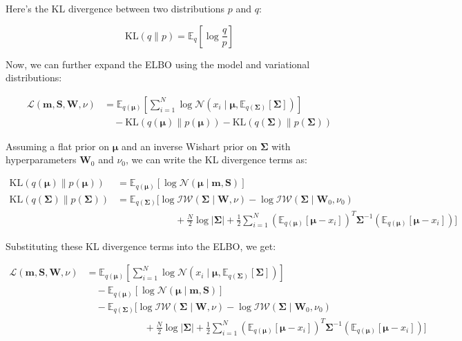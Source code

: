 \documentclass[11pt]{article}
\begin{document}
    Here's the KL divergence between two distributions \( p \) and \( q \):

    $$\text{KL}(q \| p) = \mathbb{E}_{q} \left[ \log \frac{q}{p} \right]$$

    Now, we can further expand the ELBO using the model and variational distributions:

    \begin{align*}
        \mathcal{L}(\boldsymbol{m}, \boldsymbol{S}, \boldsymbol{W}, \nu) &= \mathbb{E}_{q(\boldsymbol{\mu})} \left[ \sum_{i=1}^N \log \mathcal{N}(x_i \mid \boldsymbol{\mu}, \mathbb{E}_{q(\boldsymbol{\Sigma})}[\boldsymbol{\Sigma}]) \right] \\
        &\quad - \text{KL}(q(\boldsymbol{\mu}) \| p(\boldsymbol{\mu})) - \text{KL}(q(\boldsymbol{\Sigma}) \| p(\boldsymbol{\Sigma}))
    \end{align*}

    Assuming a flat prior on \( \boldsymbol{\mu} \) and an inverse Wishart prior on \( \boldsymbol{\Sigma} \) with hyperparameters \( \boldsymbol{W}_0 \) and \( \nu_0 \), we can write the KL divergence terms as:

    \begin{align*}
        \text{KL}(q(\boldsymbol{\mu}) \| p(\boldsymbol{\mu})) &= \mathbb{E}_{q(\boldsymbol{\mu})} \left[ \log \mathcal{N}(\boldsymbol{\mu} \mid \boldsymbol{m}, \boldsymbol{S}) \right] \\
        \text{KL}(q(\boldsymbol{\Sigma}) \| p(\boldsymbol{\Sigma})) &= \mathbb{E}_{q(\boldsymbol{\Sigma})} \bigg[ \log \mathcal{IW}(\boldsymbol{\Sigma} \mid \boldsymbol{W}, \nu) - \log \mathcal{IW}(\boldsymbol{\Sigma} \mid \boldsymbol{W}_0, \nu_0) \\
        &\qquad\qquad\qquad + \frac{N}{2} \log |\boldsymbol{\Sigma}| + \frac{1}{2} \sum_{i=1}^N (\mathbb{E}_{q(\boldsymbol{\mu})}[\boldsymbol{\mu} - x_i])^T \boldsymbol{\Sigma}^{-1} (\mathbb{E}_{q(\boldsymbol{\mu})}[\boldsymbol{\mu} - x_i]) \bigg]
    \end{align*}

    Substituting these KL divergence terms into the ELBO, we get:

    \begin{align*}
        \mathcal{L}(\boldsymbol{m}, \boldsymbol{S}, \boldsymbol{W}, \nu) &= \mathbb{E}_{q(\boldsymbol{\mu})} \left[ \sum_{i=1}^N \log \mathcal{N}(x_i \mid \boldsymbol{\mu}, \mathbb{E}_{q(\boldsymbol{\Sigma})}[\boldsymbol{\Sigma}]) \right] \\
        &\quad - \mathbb{E}_{q(\boldsymbol{\mu})} \left[ \log \mathcal{N}(\boldsymbol{\mu} \mid \boldsymbol{m}, \boldsymbol{S}) \right] \\
        &\quad - \mathbb{E}_{q(\boldsymbol{\Sigma})} \bigg[ \log \mathcal{IW}(\boldsymbol{\Sigma} \mid \boldsymbol{W}, \nu) - \log \mathcal{IW}(\boldsymbol{\Sigma} \mid \boldsymbol{W}_0, \nu_0) \\
        &\qquad\qquad\qquad + \frac{N}{2} \log |\boldsymbol{\Sigma}| + \frac{1}{2} \sum_{i=1}^N (\mathbb{E}_{q(\boldsymbol{\mu})}[\boldsymbol{\mu} - x_i])^T \boldsymbol{\Sigma}^{-1} (\mathbb{E}_{q(\boldsymbol{\mu})}[\boldsymbol{\mu} - x_i]) \bigg]
    \end{align*}
\end{document}

